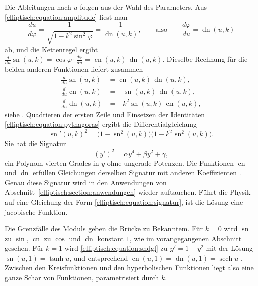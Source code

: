 Die Ableitungen nach $u$ folgen aus der Wahl des Parameters.
Aus \eqref{elliptisch:equation:amplitude} liest man
\begin{equation}
\frac{du}{d\varphi}
=
\frac{1}{\sqrt{1-k^2\sin^2\varphi}}
=
\frac{1}{\operatorname{dn}(u,k)},
\qquad\text{also}\qquad
\frac{d\varphi}{du}
=
\operatorname{dn}(u,k)
\label{elliptisch:equation:dphidu}
\end{equation}
ab, und die Kettenregel ergibt
$\frac{d}{du}\operatorname{sn}(u,k)
= \cos\varphi \cdot \frac{d\varphi}{du}
= \operatorname{cn}(u,k)\,\operatorname{dn}(u,k)$.
Dieselbe Rechnung für die beiden anderen Funktionen liefert
zusammen
\begin{equation}
\begin{aligned}
\frac{d}{du}\operatorname{sn}(u,k) &= \operatorname{cn}(u,k)\,\operatorname{dn}(u,k),\\
\frac{d}{du}\operatorname{cn}(u,k) &= -\operatorname{sn}(u,k)\,\operatorname{dn}(u,k),\\
\frac{d}{du}\operatorname{dn}(u,k) &= -k^2\operatorname{sn}(u,k)\,\operatorname{cn}(u,k),
\end{aligned}
\label{elliptisch:equation:ableitungen}
\end{equation}
siehe \cite[Satz~11.11]{elliptisch:mueller-spezielle}.
Quadrieren der ersten Zeile und Einsetzen der Identitäten
\eqref{elliptisch:equation:pythagoras} ergibt die
Differentialgleichung
\begin{equation}
\operatorname{sn}'(u,k)^2
=
\bigl(1-\operatorname{sn}^2(u,k)\bigr)
\bigl(1-k^2\operatorname{sn}^2(u,k)\bigr).
\label{elliptisch:equation:sndgl}
\end{equation}
Sie hat die Signatur
\begin{equation}
(y')^2
=
\alpha y^4 + \beta y^2 + \gamma,
\label{elliptisch:equation:signatur}
\end{equation}
ein Polynom vierten Grades in $y$ ohne ungerade Potenzen.
Die Funktionen $\operatorname{cn}$ und $\operatorname{dn}$ erfüllen
Gleichungen derselben Signatur mit anderen Koeffizienten
\cite[Abschnitt~11.2.2]{elliptisch:mueller-spezielle}.
Genau diese Signatur wird in den Anwendungen von
Abschnitt~\ref{elliptisch:section:anwendungen} wieder auftauchen.
Führt die Physik auf eine Gleichung der Form
\eqref{elliptisch:equation:signatur}, ist die Lösung eine
jacobische Funktion.

Die Grenzfälle des Moduls geben die Brücke zu Bekanntem.
Für $k = 0$ wird $\operatorname{sn}$ zu $\sin$, $\operatorname{cn}$
zu $\cos$ und $\operatorname{dn}$ konstant $1$, wie im
vorangegangenen Abschnitt gesehen.
Für $k = 1$ wird \eqref{elliptisch:equation:sndgl} zu
$y' = 1 - y^2$ mit der Lösung $\operatorname{sn}(u,1) = \tanh u$,
und entsprechend
$\operatorname{cn}(u,1) = \operatorname{dn}(u,1)
= \operatorname{sech} u$
\cite[Abschnitt~11.2.1]{elliptisch:mueller-spezielle}.
Zwischen den Kreisfunktionen und den hyperbolischen Funktionen
liegt also eine ganze Schar von Funktionen, parametrisiert durch
$k$.

